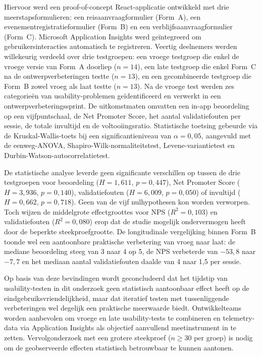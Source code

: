 Hiervoor werd een proof-of-concept React-applicatie ontwikkeld met drie meerstapsformulieren: een reisaanvraagformulier (Form~A), een evenementregistratieformulier (Form~B) en een verblijfsaanvraagformulier (Form~C). Microsoft Application Insights werd geïntegreerd om gebruikersinteracties automatisch te registreren. Veertig deelnemers werden willekeurig verdeeld over drie testgroepen: een vroege testgroep die enkel de vroege versie van Form~A doorliep ($n=14$), een late testgroep die enkel Form~C na de ontwerpverbeteringen testte ($n=13$), en een gecombineerde testgroep die Form~B zowel vroeg als laat testte ($n=13$). Na de vroege test werden zes categorieën van usability-problemen geïdentificeerd en verwerkt in een ontwerpverbeteringssprint. De uitkomstmaten omvatten een in-app beoordeling op een vijfpuntschaal, de Net Promoter Score, het aantal validatiefouten per sessie, de totale invultijd en de voltooiingsratio. Statistische toetsing gebeurde via de Kruskal-Wallis-toets bij een significantieniveau van $\alpha = 0{,}05$, aangevuld met de eenweg-ANOVA, Shapiro-Wilk-normaliteitstest, Levene-variantietest en Durbin-Watson-autocorrelatietest.

De statistische analyse leverde geen significante verschillen op tussen de drie testgroepen voor beoordeling ($H = 1{,}611$, $p = 0{,}447$), Net Promoter Score ($H = 3{,}936$, $p = 0{,}140$), validatiefouten ($H = 6{,}009$, $p = 0{,}050$) of invultijd ($H = 0{,}662$, $p = 0{,}718$). Geen van de vijf nulhypothesen kon worden verworpen. Toch wijzen de middelgrote effectgroottes voor NPS ($R^2 = 0{,}103$) en validatiefouten ($R^2 = 0{,}080$) erop dat de studie mogelijk ondervermogen heeft door de beperkte steekproefgrootte. De longitudinale vergelijking binnen Form~B toonde wel een aantoonbare praktische verbetering van vroeg naar laat: de mediane beoordeling steeg van 3 naar 4 op 5, de NPS verbeterde van $-53{,}8$ naar $-7{,}7$ en het mediaan aantal validatiefouten daalde van 4 naar 1{,}5 per sessie.

Op basis van deze bevindingen wordt geconcludeerd dat het tijdstip van usability-testen in dit onderzoek geen statistisch aantoonbaar effect heeft op de eindgebruiksvriendelijkheid, maar dat iteratief testen met tussenliggende verbeteringen wel degelijk een praktische meerwaarde biedt. Ontwikkelteams worden aanbevolen om vroege en late usability-tests te combineren en telemetry-data via Application Insights als objectief aanvullend meetinstrument in te zetten. Vervolgonderzoek met een grotere steekproef ($n \geq 30$ per groep) is nodig om de geobserveerde effecten statistisch betrouwbaar te kunnen aantonen.
